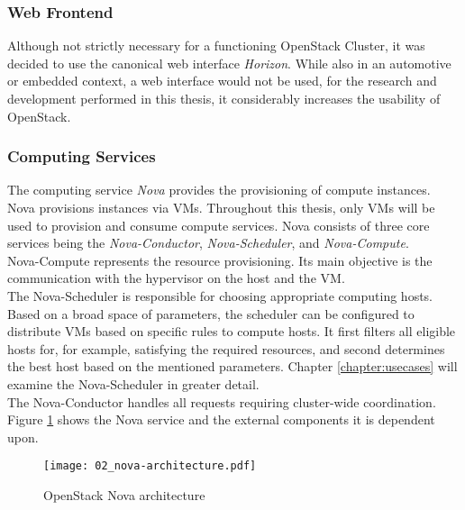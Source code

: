              
             \subsubsection{Web Frontend}
                 
                Although not strictly necessary for a functioning OpenStack Cluster, it was decided to use the canonical web interface \textsl{Horizon}.
                While also in an automotive or embedded context, a web interface would not be used, for the research and development performed in this thesis, it considerably increases the usability of OpenStack. 
                 
                 
             \subsubsection{Computing Services}
                 
                The computing service \textsl{Nova} provides the provisioning of compute instances.
                Nova provisions instances via \acp{VM}.
                Throughout this thesis, only \acp{VM} will be used to provision and consume compute services.
                Nova consists of three core services being the \textsl{Nova-Conductor}, \textsl{Nova-Scheduler}, and \textsl{Nova-Compute}.\\
                Nova-Compute represents the resource provisioning.
                Its main objective is the communication with the hypervisor on the host and the \ac{VM}.\\
                The Nova-Scheduler is responsible for choosing appropriate computing hosts.
                Based on a broad space of parameters, the scheduler can be configured to distribute \acp{VM} based on specific rules to compute hosts.
                It first filters all eligible hosts for, for example, satisfying the required resources, and second determines the best host based on the mentioned parameters.
                Chapter \ref{chapter:usecases} will examine the Nova-Scheduler in greater detail.\\
                The Nova-Conductor handles all requests requiring cluster-wide coordination.
                Figure \ref{figure:nova_architecture} shows the Nova service and the external components it is dependent upon.
                 
                 \begin{figure}[ht]
                    \begin{center} 
                        \texttt{[image: 02\_nova-architecture.pdf]} 
                        \caption[OpenStack Nova architecture]{OpenStack Nova architecture \cite{OpenStackNSA2019}}
                        \label{figure:nova_architecture}
                    \end{center}	
                 \end{figure}
                 
